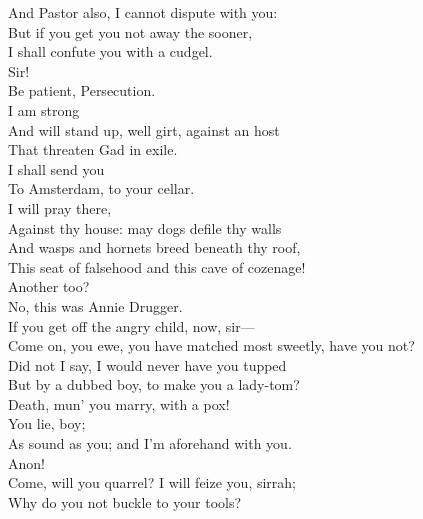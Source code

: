 \documentclass[a4paper,oneside,12pt]{memoir}
\begin{document}
\begin{drama*}
And Pastor also, I cannot dispute with you:\\
But if you get you not away the sooner,\\
I shall confute you with a cudgel.\\
\persecutionspeaks {} Sir!\\
\tribulationspeaks Be patient, Persecution.\\
\persecutionspeaks {} I am strong\\
And will stand up, well girt, against an host\\
That threaten Gad in exile.\\
\lovewitspeaks {} I shall send you\\
To Amsterdam, to your cellar.\\
\persecutionspeaks {} I will pray there,\\
Against thy house: may dogs defile thy walls\\
And wasps and hornets breed beneath thy roof,\\
This seat of falsehood and this cave of cozenage!\\
\lovewitspeaks Another too?\\
\facespeaks {} No, this was Annie Drugger.\\
If you get off the angry child, now, sir---\\
\kastrilspeaks Come on, you ewe, you have matched most sweetly, have you not?\\
Did not I say, I would never have you tupped\\
But by a dubbed boy, to make you a lady-tom?\\
Death, mun' you marry, with a pox!\\
\lovewitspeaks {} You lie, boy;\\
As sound as you; and I'm aforehand with you.\\
\kastrilspeaks Anon!\\
\lovewitspeaks {} Come, will you quarrel? I will feize you, sirrah;\\
Why do you not buckle to your tools?\\

\end{drama*}
\end{document}

